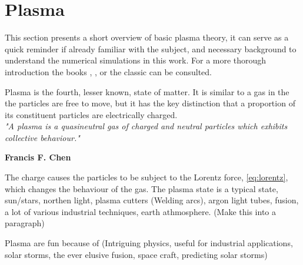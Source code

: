 \section{Plasma}
	\label{sec:plasma}
	This section presents a short overview of basic plasma theory, it can serve as a
	quick reminder if already familiar with the subject, and necessary
	background to understand the numerical simulations in this work.
	For a more thorough introduction the books \textit{}
    \citep{fitzpatrick_plasma_2014}, \textit{} \citep{goldston_introduction_1995},
    \textit{} \citep{pecseli_waves_2012} or the classic
    \textit{} \citep{chen_introduction_1984} can be consulted.

	Plasma is the fourth, lesser known, state of matter. It is similar to a gas
	in the the particles are free to move, but it has the key distinction that
	a proportion of its constituent particles are electrically charged.
	\\[1.0cm]
	\indent \textit{\large"A plasma is a quasineutral gas of charged and neutral particles which exhibits
	collective behaviour."}
	\begin{flushright}
	    \textbf{Francis F. Chen}\\[1.0cm]
	\end{flushright}
	The charge causes the particles to be subject to the Lorentz force, \cref{eq:lorentz}, which
	changes the behaviour of the gas. The plasma state is a typical state,
	sun/stars, northen light, plasma cutters (Welding arcs), argon light tubes, fusion, a lot of various
	industrial techniques, earth athmosphere. (Make this into a paragraph)

	Plasma are fun because of (Intriguing physics, useful for industrial applications,
	solar storms, the ever elusive fusion, space craft, predicting solar storms)

